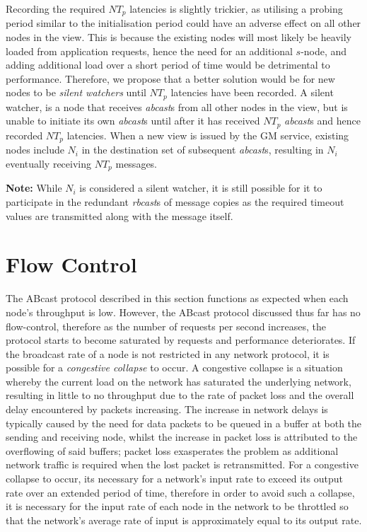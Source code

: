     Recording the required $NT_p$ latencies is slightly trickier, as utilising a probing period similar to the initialisation period could have an adverse effect on all other nodes in the view.  This is because the existing nodes will most likely be heavily loaded from application requests, hence the need for an additional $s$-node, and adding additional load over a short period of time would be detrimental to performance.  Therefore, we propose that a better solution would be for new nodes to be \emph{silent watchers} until $NT_p$ latencies have been recorded.  A silent watcher, is a node that receives \emph{abcast}s from all other nodes in the view, but is unable to initiate its own \emph{abcast}s until after it has received $NT_p$ \emph{abcast}s and hence recorded $NT_p$ latencies.  When a new view is issued by the GM service, existing nodes include $N_i$ in the destination set of subsequent \emph{abcast}s, resulting in $N_i$ eventually receiving $NT_p$ messages.  
    
    \textbf{Note:} While $N_i$ is considered a silent watcher, it is still possible for it to participate in the redundant \emph{rbcast}s of message copies as the required timeout values are transmitted along with the message itself.      

\section{Flow Control}
The \textsf{ABcast} protocol described in this section functions as expected when each node's throughput is low.  However, the \textsf{ABcast} protocol discussed thus far has no flow-control, therefore as the number of requests per second increases, the protocol starts to become saturated by requests and performance deteriorates.  If the broadcast rate of a node is not restricted in any network protocol, it is possible for a \emph{congestive collapse} \citep{CongestiveCollapse, Jacobson:1988:CAC:52324.52356} to occur.  A congestive collapse is a situation whereby the current load on the network has saturated the underlying network, resulting in little to no throughput due to the rate of packet loss and the overall delay encountered by packets increasing.  The increase in network delays is typically caused by the need for data packets to be queued in a buffer at both the sending and receiving node, whilst the increase in packet loss is attributed to the overflowing of said buffers; packet loss exasperates the problem as additional network traffic is required when the lost packet is retransmitted.  For a congestive collapse to occur, its necessary for a network's input rate to exceed its output rate over an extended period of time, therefore in order to avoid such a collapse, it is necessary for the input rate of each node in the network to be throttled so that the network's average rate of input is approximately equal to its output rate.  

